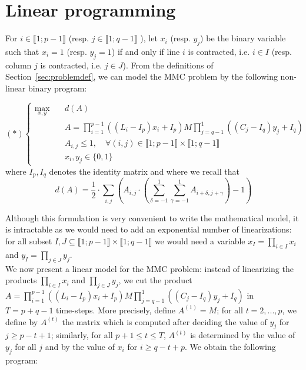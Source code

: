 
\section{Linear programming}
\label{sec:linearprog}

For $i \in \llbracket 1; p-1 \rrbracket$ (resp.  $j \in \llbracket 1; q-1 \rrbracket$ ), let $x_i$ (resp. $y_j$) be the binary variable such that $x_i=1$ (resp. $y_j=1$) if and only if line $i$ is contracted, i.e. $i \in I$ (resp. column $j$ is contracted, i.e. $j \in J$). From the definitions of Section~\ref{sec:problemdef}, we can model the MMC problem by the following non-linear binary program:

\begin{equation*}
(\ast)\left\{
\begin{array}{lll}
\max\limits_{x,y}  \quad	& d(A)  \\
& A= \prod\limits_{i=1}^{p-1}((L_i-I_p)x_i+I_p)M\prod\limits_{j=q-1}^{1}((C_j-I_q)y_j+I_q) \\
& A_{i,j} \le 1, \quad \forall (i,j) \in \llbracket 1; p-1 \rrbracket \times \llbracket 1; q-1 \rrbracket \\
& x_i,y_j \in \{0,1\}
\end{array}\right.
\end{equation*}
where $I_p,I_q$ denotes the identity matrix and where we recall that $$d(A)= \frac{1}{2} \cdot \sum\limits_{i,j} \left( A_{i,j} \cdot \left(\sum\limits_{\delta = -1}^1 \sum\limits_{\gamma = -1}^1  A_{i+\delta,j+\gamma}\right) - 1 \right)$$

\noindent Although this formulation is very convenient to write the mathematical model, it is intractable as we would need to add an exponential number of linearizations: for all subset $ I,J \subseteq \llbracket 1; p-1 \rrbracket \times \llbracket 1; q-1 \rrbracket$ we would need a variable $x_I=\prod\limits_{i \in I}x_i $ and $y_I=\prod\limits_{j \in J}y_j $.\\

\noindent We now present a linear model for the MMC problem: instead of linearizing the products $\prod\limits_{i \in I}x_i$ and $\prod\limits_{j \in J}y_j$, we cut the product \\
$A= \prod\limits_{i=1}^{p-1}((L_i-I_p)x_i+I_p)M\prod\limits_{j=q-1}^{1}((C_j-I_q)y_j+I_q) $ in $T=p+q-1$ time-steps. More precisely, define $A^{(1)}=M$; for all $t=2,...,p$, we define by $A^{(t)}$ the matrix which is computed after deciding the value of $y_j$ for $j \ge p-t+1$; similarly, for all $p+1\le t \le T$, $A^{(t)}$ is determined by the value of $y_j$ for all $j$ and by the value of $x_i$ for $i \ge q -t+p $. We obtain the following program:

